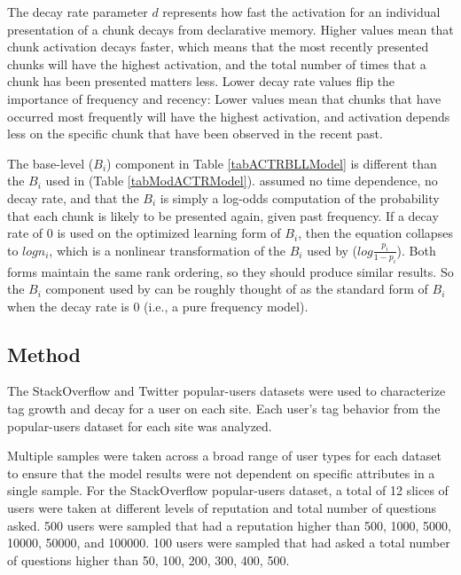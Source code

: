 \documentclass[man,floatsintext,donotrepeattitle]{apa6}
\begin{document}
The decay rate parameter $d$ represents how fast the activation for an individual presentation of a chunk decays from declarative memory.
Higher values mean that chunk activation decays faster, which means that the most recently presented chunks will have the highest activation, and the total number of times that a chunk has been presented matters less.
Lower decay rate values flip the importance of frequency and recency: Lower values mean that chunks that have occurred most frequently will have the highest activation,
and activation depends less on the specific chunk that have been observed in the recent past.

The base-level ($B_{i}$) component in Table \ref{tabACTRBLLModel} is different than the $B_{i}$ used in \textcite{Stanley2013} (Table \ref{tabModACTRModel}).
\citeauthor{Stanley2013} assumed no time dependence, no decay rate, and that the $B_{i}$ is simply a log-odds computation of the probability that each chunk is likely to be presented again, given past frequency.
If a decay rate of 0 is used on the optimized learning form of $B_{i}$, then the equation collapses to $log n_{i}$,
which is a nonlinear transformation of the $B_{i}$ used by \citeauthor{Stanley2013} ($log \frac{p_{i}}{1-p_{i}}$).
Both forms maintain the same rank ordering, so they should produce similar results.
So the $B_{i}$ component used by \citeauthor{Stanley2013} can be roughly thought of as the standard form of $B_{i}$ when the decay rate is 0 (i.e., a pure frequency model).

\subsection{Method}

The StackOverflow and Twitter popular-users datasets were used to characterize tag growth and decay for a user on each site.
Each user's tag behavior from the popular-users dataset for each site was analyzed. 

Multiple samples were taken across a broad range of user types for each dataset to ensure that the model results were not dependent on specific attributes in a single sample.
For the StackOverflow popular-users dataset, a total of 12 slices of users were taken at different levels of reputation and total number of questions asked.
500 users were sampled that had a reputation higher than \num{500}, \num{1000}, \num{5000}, \num{10000}, \num{50000}, and \num{100000}.
100 users were sampled that had asked a total number of questions higher than \num{50}, \num{100}, \num{200}, \num{300}, \num{400}, \num{500}.
\end{document}
